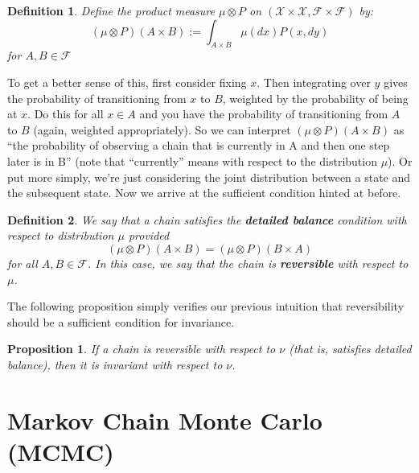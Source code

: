 \documentclass[12pt]{article}
\newtheorem{definition}{Definition}
\newtheorem{prop}{Proposition}
\begin{document}
\begin{definition}
Define the product measure $\mu \otimes P$ on $(\mathcal{X} \times \mathcal{X}, \mathcal{F} \times \mathcal{F})$ by: 
\[(\mu \otimes P)(A \times B) := \int_{A \times B} \mu(dx) P(x, dy)\]
for $A, B \in \mathcal{F}$
\end{definition}
To get a better sense of this, first consider fixing $x$. Then integrating over $y$ gives the probability of transitioning from $x$ to $B$, weighted by 
the probability of being at $x$. Do this 
for all $x \in A$ and you have the probability of transitioning from $A$ to $B$ (again, weighted appropriately). So we can interpret 
$(\mu \otimes P)(A \times B)$ as ``the probability of observing a chain that is currently in A and then one step later is in B'' (note that 
``currently'' means with respect to the distribution $\mu$). Or put more simply, we're just considering the joint distribution between 
a state and the subsequent state. Now we arrive at the sufficient condition hinted at before. 

\begin{definition}
We say that a chain satisfies the \textbf{detailed balance} condition with respect to distribution $\mu$ provided 
\[(\mu \otimes P)(A \times B) = (\mu \otimes P)(B \times A)\]
for all $A, B \in \mathcal{F}$. In this case, we say that the chain is \textbf{reversible} with respect to $\mu$. 
\end{definition}

The following proposition simply verifies our previous intuition that reversibility should be a sufficient condition for invariance. 
\begin{prop}
If a chain is reversible with respect to $\nu$ (that is, satisfies detailed balance), then it is invariant with respect to $\nu$. 
\end{prop}

\section{Markov Chain Monte Carlo (MCMC)}
\end{document}

